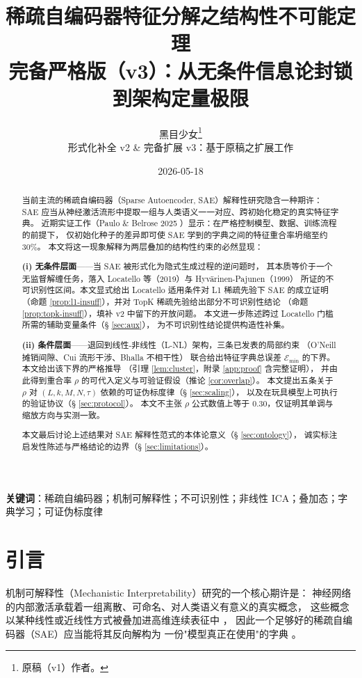 \documentclass[11pt,a4paper]{article}
\title{\textbf{稀疏自编码器特征分解之结构性不可能定理}\\[2pt]
\large 完备严格版（v3）：从无条件信息论封锁到架构定量极限}
\author{黑目少女\thanks{原稿（v1）作者。}\\[2pt]
{\small 形式化补全 v2 \& 完备扩展 v3：基于原稿之扩展工作}}
\date{2026-05-18}
\theoremstyle{remark}
\newcommand{\Err}{\mathcal{E}}
\begin{document}
\maketitle

\begin{abstract}
\noindent 当前主流的稀疏自编码器（Sparse Autoencoder, SAE）解释性研究隐含一种期许：
SAE 应当从神经激活流形中提取一组与人类语义一一对应、跨初始化稳定的真实特征字典。
近期实证工作（Paulo \& Belrose 2025 \cite{paulo2025}）显示：在严格控制模型、数据、训练流程的前提下，
仅初始化种子的差异即可使 SAE 学到的字典之间的特征重合率坍缩至约 30\%。
本文将这一现象解释为两层叠加的结构性约束的必然显现：

\textbf{(i) 无条件层面}——当 SAE 被形式化为隐式生成过程的逆问题时，
其本质等价于一个无监督解缠任务，落入 Locatello 等（2019）与 Hyvärinen-Pajunen（1999）
所证的不可识别性区间。本文显式给出 Locatello 适用条件对 L1 稀疏先验下 SAE 的成立证明
（命题 \ref{prop:l1-insuff}），并对 TopK 稀疏先验给出部分不可识别性结论
（命题 \ref{prop:topk-insuff}），填补 v2 中留下的开放问题。
本文进一步陈述跨过 Locatello 门槛所需的辅助变量条件（§ \ref{sec:aux}），
为不可识别性结论提供构造性补集。

\textbf{(ii) 条件层面}——退回到线性-非线性（L-NL）架构，三条已发表的局部约束
（O'Neill 摊销间隙、Cui 流形干涉、Bhalla 不相干性）
联合给出特征字典总误差 $\Err_{\min}$ 的下界。本文给出该下界的严格推导
（引理 \ref{lem:cluster}，附录 \ref{app:proof} 含完整证明），
并由此得到重合率 $\rho$ 的可代入定义与可验证假设（推论 \ref{cor:overlap}）。
本文提出五条关于 $\rho$ 对 $(L, k, M, N, \tau)$ 依赖的可证伪标度律（§ \ref{sec:scaling}），
以及在玩具模型上可执行的验证协议（§ \ref{sec:protocol}）。
本文不主张 $\rho$ 公式数值上等于 0.30，仅证明其单调与缩放方向与实测一致。

本文最后讨论上述结果对 SAE 解释性范式的本体论意义（§ \ref{sec:ontology}），
诚实标注启发性陈述与严格结论的边界（§ \ref{sec:limitations}）。
\end{abstract}

\noindent\textbf{关键词}：稀疏自编码器；机制可解释性；不可识别性；非线性 ICA；叠加态；字典学习；可证伪标度律

\tableofcontents

\section{引言}\label{sec:intro}

机制可解释性（Mechanistic Interpretability）研究的一个核心期许是：
神经网络的内部激活承载着一组离散、可命名、对人类语义有意义的真实概念，
这些概念以某种线性或近线性方式被叠加进高维连续表征中 \cite{elhage2022}，
因此一个足够好的稀疏自编码器（SAE）应当能将其反向解构为
一份"模型真正在使用"的字典 \cite{bricken2023,templeton2024}。
\end{document}
